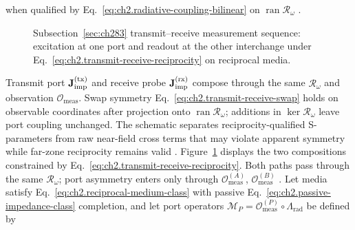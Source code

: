 when qualified by Eq.~\eqref{eq:ch2.radiative-coupling-bilinear} on
\(\operatorname{ran}\mathcal{R}_\omega\) \cite{stratton1941}.
\begin{figure}[t]
\centering
{}
\caption{Subsection~\ref{sec:ch283} transmit--receive measurement sequence: excitation at one port and
readout at the other interchange under Eq.~\eqref{eq:ch2.transmit-receive-reciprocity} on
reciprocal media.}
\label{fig:ch2.transmit-receive-measurement chain}
\end{figure}
Transmit port $\mathbf{J}_{\mathrm{imp}}^{\mathrm{(tx)}}$ and receive probe $\mathbf{J}_{\mathrm{imp}}^{\mathrm{(rx)}}$ compose through the same $\mathcal{R}_\omega$ and observation $\mathcal{O}_{\mathrm{meas}}$. Swap symmetry Eq.~\eqref{eq:ch2.transmit-receive-swap} holds on observable coordinates after projection onto $\operatorname{ran}\mathcal{R}_\omega$; additions in $\ker\mathcal{R}_\omega$ leave port coupling unchanged. The schematic separates reciprocity-qualified S-parameters from raw near-field cross terms that may violate apparent symmetry while far-zone reciprocity remains valid \cite{stratton1941}. Figure~\ref{fig:ch2.transmit-receive-measurement chain} displays the two compositions constrained by
Eq.~\eqref{eq:ch2.transmit-receive-reciprocity}. Both paths pass through the same
\(\mathcal{R}_\omega\); port asymmetry enters only through \(\mathcal{O}_{\mathrm{meas}}^{(A)}\),
\(\mathcal{O}_{\mathrm{meas}}^{(B)}\) \cite{stratton1941}.
\label{thm:ch2.radiation-reception-reciprocity}
Let media satisfy Eq.~\eqref{eq:ch2.reciprocal-medium-class} with passive
Eq.~\eqref{eq:ch2.passive-impedance-class} completion, and let port operators
\(\mathcal{M}_P=\mathcal{O}_{\mathrm{meas}}^{(P)}\circ\Lambda_{\mathrm{rad}}\) be defined by

